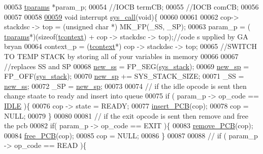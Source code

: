 \begin{DoxyCode}
00053 \hyperlink{structparams}{tparams}  *param\_p;
00054 \textcolor{comment}{//IOCB termCB;}
00055 \textcolor{comment}{//IOCB comCB;}
00056 
00057 
00058 
\hypertarget{mpx__r3_8c_source_l00059}{}\hyperlink{_m_p_x___r3_8_h_abeb8ddb92acb8fa40e902b98f2a1ccfb}{00059} \textcolor{keywordtype}{void} interrupt \hyperlink{mpx__r3_8c_abeb8ddb92acb8fa40e902b98f2a1ccfb}{sys_call}(\textcolor{keywordtype}{void})\{
00060         
00061 
00062         cop-> stackdsc -> top = (\textcolor{keywordtype}{unsigned} \textcolor{keywordtype}{char} *) MK\_FP(\_SS, \_SP);
00063         param\_p = ( \hyperlink{structparams}{tparams}*)(\textcolor{keyword}{sizeof}(\hyperlink{structcontext}{tcontext}) + cop -> stackdsc -> top);\textcolor{comment}{//code s
      upplied by GA bryan}
00064         context\_p = (\hyperlink{structcontext}{tcontext}*) cop -> stackdsc -> top;
00065         \textcolor{comment}{//SWITCH TO TEMP STACK by storing all of your variables in memory}
00066         
00067         \textcolor{comment}{//replaces SS and SP}
00068         \hyperlink{mpx__r3_8c_a15a3c2a819d08f7ea4c3f453ca0f7f9c}{new_ss} = FP\_SEG(\hyperlink{mpx__r3_8c_a5e9ba16a803c3deb38f984cba2e42d5f}{sys_stack});
00069         \hyperlink{mpx__r3_8c_a1838f728cba427f51c6c45aa89cec007}{new_sp} = FP\_OFF(\hyperlink{mpx__r3_8c_a5e9ba16a803c3deb38f984cba2e42d5f}{sys_stack});
00070         \hyperlink{mpx__r3_8c_a1838f728cba427f51c6c45aa89cec007}{new_sp} += SYS\_STACK\_SIZE;
00071         \_SS = \hyperlink{mpx__r3_8c_a15a3c2a819d08f7ea4c3f453ca0f7f9c}{new_ss};
00072         \_SP = \hyperlink{mpx__r3_8c_a1838f728cba427f51c6c45aa89cec007}{new_sp};
00073         
00074         \textcolor{comment}{// if the idle opcode is sent then change staate to ready and insert into
       queue}
00075         \textcolor{keywordflow}{if} ( param\_p -> op\_code == \hyperlink{_m_p_x___r5_8h_a9c21a7caee326d7803b94ae1952b27ca}{IDLE} )\{
00076                         cop -> state = READY;
00077                         \hyperlink{mpx__r2_8c_aa3b334e3a5afd6e590917667ad359a6f}{insert_PCB}(cop);
00078                         cop = NULL;
00079         \}
00080         
00081         \textcolor{comment}{// if the exit opcode is sent then remove and free the pcb}
00082         \textcolor{keywordflow}{if}( param\_p -> op\_code == EXIT )\{
00083                 \hyperlink{mpx__r2_8c_af30a3658210d449b4b53e5be2ed2bc2e}{remove_PCB}(cop);
00084                 \hyperlink{mpx__r2_8c_a79890f055b1d0fccf1962bbde4877caa}{free_PCB}(cop);
00085                 cop = NULL;
00086         \}
00087         
00088         \textcolor{comment}{// if ( param\_p -> op\_code == READ )\{}

\end{DoxyCode}
